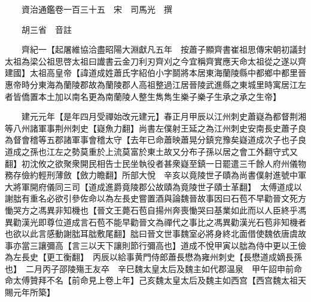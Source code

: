 










 


 
 


 

  
  
  
  
  





  
  
  
  
  
 
  

  

  
  
  



  

 
 

  
   




  

  
  


  　　資治通鑑卷一百三十五　宋　司馬光　撰

　　胡三省　音註

　　齊紀一【起屠維協洽盡昭陽大淵獻凡五年　按蕭子顯齊書崔祖思傳宋朝初議封太祖為梁公祖思啓太祖曰䜟書云金刀利刃齊刈之今宜稱齊實應天命太祖從之遂以齊建國】太祖高皇帝【諱道成姓蕭氏字紹伯小字鬬將本居東海蘭陵縣中都鄉中都里晉惠帝時分東海為蘭陵郡故為蘭陵郡人高祖整過江居晉陵武進縣之東城里時寓居江左者皆僑置本土加以南名更為南蘭陵人整生雋雋生樂子樂子生承之承之生帝】

　　建元元年【是年四月受禪始改元建元】春正月甲辰以江州刺史蕭嶷為都督荆湘等八州諸軍事荆州刺史【嶷魚力翻】尚書左僕射王延之為江州刺史安南長史蕭子良為督會稽等五郡諸軍事會稽太守【去年已命蕭映蕭晃分鎮兖豫矣嶷道成次子也子良道成之孫也江左之勢莫重於上流莫富於東土故又分布子孫以居之會工外翻守式又翻】初沈攸之欲聚衆開民相告士民坐執役者甚衆嶷至鎮一日罷遣三千餘人府州儀物務存儉約輕刑薄斂【斂力瞻翻】所部大悅　辛亥以竟陵世子賾為尚書僕射進號中軍大將軍開府儀同三司【道成進爵竟陵郡公故賾為竟陵世子賾士革翻】　太傅道成以謝朏有重名必欲引參佐命以為左長史嘗置酒與論魏晉故事因曰石苞不早勸晉文死方慟哭方之馮異非知機也【晉文王薨石苞自揚州奔喪慟哭曰基業如此而以人臣終乎馮異勸漢光即尊位道成言石苞不能早勸晉文為禪代之事比之馮異勸漢光石苞非知機者也欲以此言感動謝朏耳朏敷尾翻】朏曰晉文世事魏室必將身終北面借使魏依唐虞故事亦當三讓彌高【言三以天下讓則節行彌高也】道成不悅甲寅以朏為侍中更以王儉為左長史【更工衡翻】　丙辰以給事黄門侍郎蕭長懋為雍州刺史【長懋道成嫡長孫也】　二月丙子邵陵殤王友卒　辛巳魏太皇太后及魏主如代郡温泉　甲午詔申前命命太傅贊拜不名【前命見上卷上年】己亥魏太皇太后及魏主如西宫【西宫魏太祖天賜元年所築】

